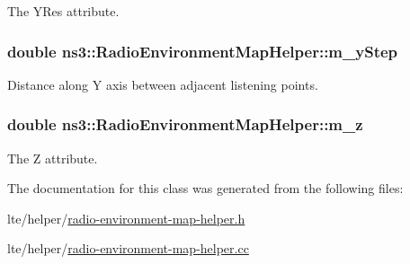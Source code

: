The {\ttfamily Y\+Res} attribute. 

\subsubsection[{\texorpdfstring{m\+\_\+y\+Step}{m_yStep}}]{\setlength{\rightskip}{0pt plus 5cm}double ns3\+::\+Radio\+Environment\+Map\+Helper\+::m\+\_\+y\+Step\hspace{0.3cm}{\ttfamily [private]}}\hypertarget{classns3_1_1RadioEnvironmentMapHelper_ae8a3bb9ec904f4dd3c1f8326a2e23095}{}\label{classns3_1_1RadioEnvironmentMapHelper_ae8a3bb9ec904f4dd3c1f8326a2e23095}


Distance along Y axis between adjacent listening points. 

\subsubsection[{\texorpdfstring{m\+\_\+z}{m_z}}]{\setlength{\rightskip}{0pt plus 5cm}double ns3\+::\+Radio\+Environment\+Map\+Helper\+::m\+\_\+z\hspace{0.3cm}{\ttfamily [private]}}\hypertarget{classns3_1_1RadioEnvironmentMapHelper_a4c45c1522f5ec57867cc16e38dc7dd9d}{}\label{classns3_1_1RadioEnvironmentMapHelper_a4c45c1522f5ec57867cc16e38dc7dd9d}


The {\ttfamily Z} attribute. 



The documentation for this class was generated from the following files\+:\begin{DoxyCompactItemize}
\item 
lte/helper/\hyperlink{radio-environment-map-helper_8h}{radio-\/environment-\/map-\/helper.\+h}\item 
lte/helper/\hyperlink{radio-environment-map-helper_8cc}{radio-\/environment-\/map-\/helper.\+cc}\end{DoxyCompactItemize}

